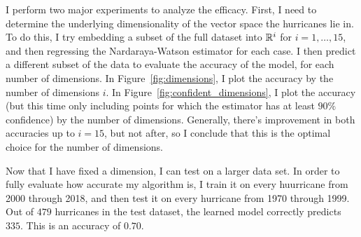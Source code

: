 
\par
I perform two major experiments to analyze the efficacy.
First, I need to determine the underlying dimensionality of the vector space the hurricanes lie in.
To do this, I try embedding a subset of the full dataset into $\mathbb{R}^{i}$ for $i=1,\ldots,15$, and then regressing the Nardaraya-Watson estimator for each case.
I then predict a different subset of the data to evaluate the accuracy of the model, for each number of dimensions.
In Figure~\ref{fig:dimensions}, I plot the accuracy by the number of dimensions $i$.
In Figure~\ref{fig:confident_dimensions}, I plot the accuracy (but this time only including points for which the estimator has at least $90\%$ confidence) by the number of dimensions.
Generally, there's improvement in both accuracies up to $i=15$, but not after, so I conclude that this is the optimal choice for the number of dimensions.

\par
Now that I have fixed a dimension, I can test on a larger data set.
In order to fully evaluate how accurate my algorithm is, I train it on every huurricane from 2000 through 2018, and then test it on every hurricane from 1970 through 1999.
Out of $479$ hurricanes in the test dataset, the learned model correctly predicts $335$.
This is an accuracy of $0.70$.